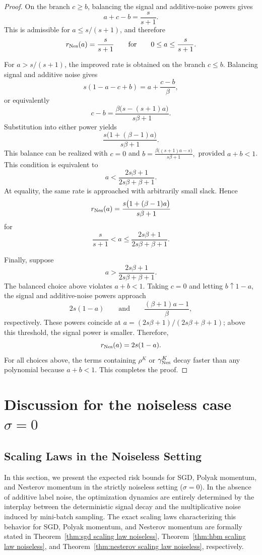 \begin{proof}
On the branch \(c\geq b\), balancing the signal and additive-noise powers gives
\[
a+c-b=\frac{s}{s+1}.
\]
This is admissible for \(a\leq s/(s+1)\), and therefore
\[
r_{\rm Nes}(a)=\frac{s}{s+1}
\qquad\text{for}\qquad
0\leq a\leq\frac{s}{s+1}.
\]

For \(a>s/(s+1)\), the improved rate is obtained on the branch \(c\leq b\). Balancing signal and additive noise gives
\[
s(1-a-c+b)
=
a+\frac{c-b}{\beta},
\]
or equivalently
\[
c-b
=
\frac{\beta\bigl(s-(s+1)a\bigr)}{s\beta+1}.
\]
Substitution into either power yields
\[
\frac{s\bigl(1+(\beta-1)a\bigr)}{s\beta+1}.
\]
This balance can be realized with \(c=0\) and
\(b=\frac{\beta\bigl((s+1)a-s\bigr)}{s\beta+1},\)
provided \(a+b<1\). This condition is equivalent to
\[
a<\frac{2s\beta+1}{2s\beta+\beta+1}.
\]
At equality, the same rate is approached with arbitrarily small slack. Hence
\[
r_{\rm Nes}(a)
=
\frac{s\bigl(1+(\beta-1)a\bigr)}{s\beta+1}
\]
for
\[
\frac{s}{s+1}<a\leq
\frac{2s\beta+1}{2s\beta+\beta+1}.
\]

Finally, suppose
\[
a>
\frac{2s\beta+1}{2s\beta+\beta+1}.
\]
The balanced choice above violates \(a+b<1\). Taking \(c=0\) and letting \(b\uparrow1-a\), the signal and additive-noise powers approach
\[
2s(1-a)
\qquad\text{and}\qquad
\frac{(\beta+1)a-1}{\beta},
\]
respectively. These powers coincide at
\(a=(2s\beta+1)/(2s\beta+\beta+1)\); above this threshold, the signal power is smaller. Therefore,
\[
r_{\rm Nes}(a)=2s(1-a).
\]
For all choices above, the terms containing \(\rho^K\) or \(\gamma_{\rm Nes}^K\) decay faster than any polynomial because \(a+b<1\). This completes the proof.
\end{proof}

\newpage
\section{Discussion for the noiseless case \texorpdfstring{\(\sigma=0\)}{sigma = 0}}
\label{app:noiseless}

\subsection{Scaling Laws in the Noiseless Setting}

In this section, we present the expected risk bounds for SGD, Polyak momentum, and Nesterov momentum in the strictly noiseless setting (\(\sigma = 0\)). In the absence of additive label noise, the optimization dynamics are entirely determined by the interplay between the deterministic signal decay and the multiplicative noise induced by mini-batch sampling. The exact scaling laws characterizing this behavior for SGD, Polyak momentum, and Nesterov momentum are formally stated in Theorem~\ref{thm:sgd scaling law noiseless}, Theorem~\ref{thm:hbm scaling law noiseless}, and Theorem~\ref{thm:nesterov scaling law noiseless}, respectively.

